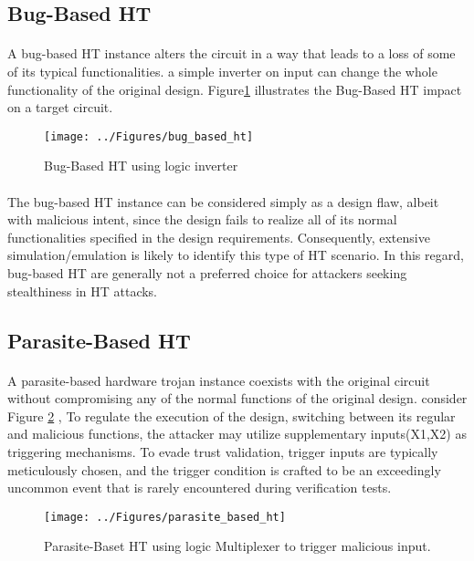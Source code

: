 \subsection*{Bug-Based HT}
\paragraph*{}
A bug-based HT instance alters the circuit in a way that leads to a loss of some of its typical functionalities. a simple inverter on input can change the whole functionality of the original design. Figure\ref{fig:bugbasedht} illustrates the Bug-Based HT impact on a target circuit.
\begin{figure}[h]
	\centering
	\texttt{[image: ../Figures/bug\_based\_ht]}
	\caption{Bug-Based HT using logic inverter}
	\label{fig:bugbasedht}
\end{figure}
\paragraph*{}
The bug-based HT instance can be considered simply as a design flaw, albeit with malicious intent, since the design fails to realize all of its normal functionalities specified in the design requirements. Consequently, extensive simulation/emulation is likely to identify this type of HT scenario. In this regard, bug-based HT are generally not a preferred choice for attackers seeking stealthiness in HT attacks.
\subsection*{Parasite-Based HT}
\paragraph*{}
A parasite-based hardware trojan instance coexists with the original circuit without compromising any of the normal functions of the original design. consider Figure \ref{fig:parasitebasedht} , To regulate the execution of the design, switching between its regular and malicious functions, the attacker may utilize supplementary inputs(X1,X2) as triggering mechanisms. To evade trust validation, trigger inputs are typically meticulously chosen, and the trigger condition is crafted to be an exceedingly uncommon event that is rarely encountered during verification tests.
\begin{figure}[h]
	\centering
	\texttt{[image: ../Figures/parasite\_based\_ht]}
	\caption{Parasite-Baset HT using logic Multiplexer to trigger malicious input.}
	\label{fig:parasitebasedht}
\end{figure}

